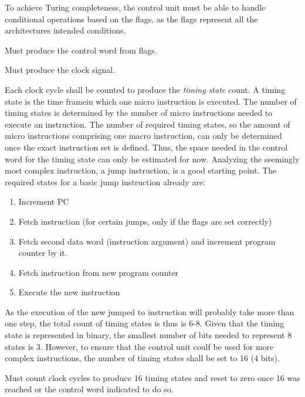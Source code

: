 To achieve Turing completeness, the control unit must be able to handle conditional operations based on the flags, as the flags represent all the architectures intended conditions.

\begin{turing-requirement}
  Must produce the control word from flags.
\end{turing-requirement}



\begin{arch-requirement}
  Must produce the clock signal. 
\end{arch-requirement}

Each clock cycle shall be counted to produce the \textit{timing state} count. A timing state is the time framein which one micro instruction is executed. The number of timing states is determined by the number of micro instructions needed to execute an instruction. The number of required timing states, so the amount of micro instructions comprising one macro instruction, can only be determined once the exact instruction set is defined. Thus, the space needed in the control word for the timing state can only be estimated for now. Analyzing the seemingly most complex instruction, a jump instruction, is a good starting point.
The required states for a basic jump instruction already are: 
\begin{enumerate}
  \item Increment PC
  \item Fetch instruction (for certain jumps, only if the flags are set correctly)
  \item Fetch second data word (instruction argument) and increment program counter by it.
  \item Fetch instruction from new program counter
  \item Execute the new instruction
\end{enumerate}
    
As the execution of the new jumped to instruction will probably take more than one step, the total count of timing states is thus is 6-8. Given that the timing state is represented in binary, the smallest number of bits needed to represent 8 states is 3. However, to ensure that the control unit coulf be used for more complex instructions, the number of timing states shall be set to 16 (4 bits).

\begin{arch-requirement}
  Must count clock cycles to produce 16 timing states and reset to zero once 16 was reached or the control word indicated to do so.
\end{arch-requirement}

